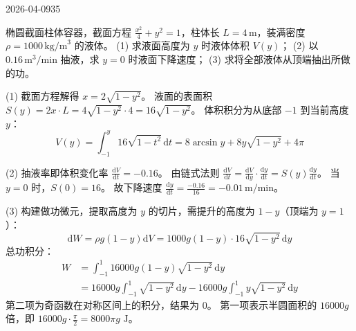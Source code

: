 \begin{mistake}{2026-04-09}{35}

\begin{problemcontent}
椭圆截面柱体容器，截面方程 \( \frac{x^2}{4} + y^2 = 1 \)，柱体长 \( L = 4\,\text{m} \)，装满密度 \( \rho = 1000\,\text{kg/m}^3 \) 的液体。
(1) 求液面高度为 \( y \) 时液体体积 \( V(y) \)；
(2) 以 \( 0.16\,\text{m}^3/\text{min} \) 抽液，求 \( y=0 \) 时液面下降速度；
(3) 求将全部液体从顶端抽出所做的功。
\end{problemcontent}

\begin{solutioncontent}
(1) 截面方程解得 \( x = 2\sqrt{1-y^2} \)。
液面的表面积 \( S(y) = 2x \cdot L = 4\sqrt{1-y^2} \cdot 4 = 16\sqrt{1-y^2} \)。
体积积分为从底部 \( -1 \) 到当前高度 \( y \)：
\[
V(y) = \int_{-1}^{y} 16\sqrt{1-t^2}\,\mathrm{d}t = 8\arcsin y + 8y\sqrt{1-y^2} + 4\pi
\]

(2) 抽液率即体积变化率 \( \frac{\mathrm{d}V}{\mathrm{d}t} = -0.16 \)。
由链式法则 \( \frac{\mathrm{d}V}{\mathrm{d}t} = \frac{\mathrm{d}V}{\mathrm{d}y} \cdot \frac{\mathrm{d}y}{\mathrm{d}t} = S(y)\frac{\mathrm{d}y}{\mathrm{d}t} \)。
当 \( y=0 \) 时，\( S(0) = 16 \)。
故下降速度 \( \frac{\mathrm{d}y}{\mathrm{d}t} = \frac{-0.16}{16} = -0.01\,\text{m/min} \)。

(3) 构建做功微元，提取高度为 \( y \) 的切片，需提升的高度为 \( 1-y \)（顶端为 \( y=1 \)）：
\[
\mathrm{d}W = \rho g (1-y) \mathrm{d}V = 1000g(1-y) \cdot 16\sqrt{1-y^2}\,\mathrm{d}y
\]
总功积分：
\[
\begin{aligned}
W &= \int_{-1}^{1} 16000g(1-y)\sqrt{1-y^2}\,\mathrm{d}y \\
&= 16000g \int_{-1}^{1} \sqrt{1-y^2}\,\mathrm{d}y - 16000g \int_{-1}^{1} y\sqrt{1-y^2}\,\mathrm{d}y
\end{aligned}
\]
第二项为奇函数在对称区间上的积分，结果为 0。
第一项表示半圆面积的 \( 16000g \) 倍，即 \( 16000g \cdot \frac{\pi}{2} = 8000\pi g \text{ J} \)。
\end{solutioncontent}


\end{mistake}

